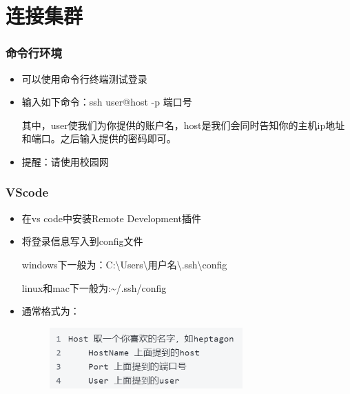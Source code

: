 \documentclass{beamer}
\begin{document}
\section{连接集群}

\begin{frame}
\frametitle{命令行环境}

\begin{itemize}
    \item<1-> 可以使用命令行终端测试登录
    \item<2-> 输入如下命令：ssh user@host -p 端口号
    
    其中，user使我们为你提供的账户名，host是我们会同时告知你的主机ip地址和端口。之后输入提供的密码即可。
     \item<3-> 提醒：请使用校园网
\end{itemize}

\end{frame}

\begin{frame}
\frametitle{VScode}

\begin{itemize}
    \item<1-> 在vs code中安装Remote Development插件
    \item<2-> 将登录信息写入到config文件
    
    windows下一般为：C:\textbackslash Users\textbackslash 用户名\textbackslash .ssh\textbackslash config
    
    linux和mac下一般为:\textasciitilde/.ssh/config
    
    \item<3-> 通常格式为：
    \begin{figure}[H] %
    	\centering %
    	\includegraphics[width=0.7\textwidth]{p1.png} %
    	\label{p1} %
    \end{figure}

\end{itemize}

\end{frame}
\end{document}
